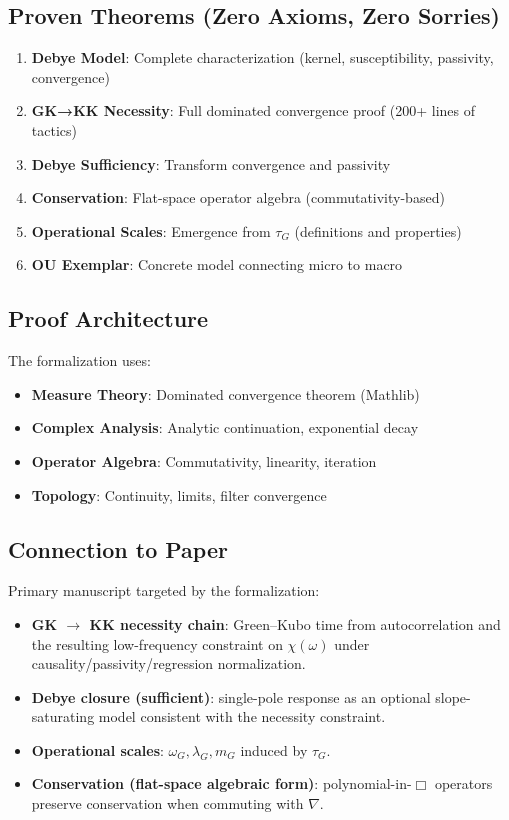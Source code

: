 \documentclass[11pt]{article}
\begin{document}
\subsection{Proven Theorems (Zero Axioms, Zero Sorries)}

\begin{enumerate}
\item \textbf{Debye Model}: Complete characterization (kernel, susceptibility, passivity, convergence)
\item \textbf{GK→KK Necessity}: Full dominated convergence proof (200+ lines of tactics)
\item \textbf{Debye Sufficiency}: Transform convergence and passivity
\item \textbf{Conservation}: Flat-space operator algebra (commutativity-based)
\item \textbf{Operational Scales}: Emergence from $\tau_G$ (definitions and properties)
\item \textbf{OU Exemplar}: Concrete model connecting micro to macro
\end{enumerate}

\subsection{Proof Architecture}

The formalization uses:
\begin{itemize}
\item \textbf{Measure Theory}: Dominated convergence theorem (Mathlib)
\item \textbf{Complex Analysis}: Analytic continuation, exponential decay
\item \textbf{Operator Algebra}: Commutativity, linearity, iteration
\item \textbf{Topology}: Continuity, limits, filter convergence
\end{itemize}

\subsection{Connection to Paper}

Primary manuscript targeted by the formalization:
\begin{itemize}
\item \textbf{GK $\to$ KK necessity chain}: Green--Kubo time from autocorrelation and the resulting low-frequency constraint on $\chi(\omega)$ under causality/passivity/regression normalization.
\item \textbf{Debye closure (sufficient)}: single-pole response as an optional slope-saturating model consistent with the necessity constraint.
\item \textbf{Operational scales}: $\omega_G,\lambda_G,m_G$ induced by $\tau_G$.
\item \textbf{Conservation (flat-space algebraic form)}: polynomial-in-$\Box$ operators preserve conservation when commuting with $\nabla$.
\end{itemize}
\end{document}
